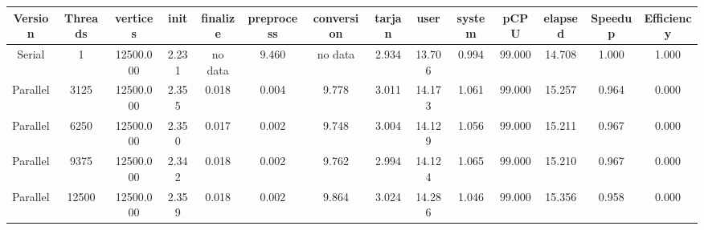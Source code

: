 \begin{tabular}{|c|c|c|c|c|c|c|c|c|c|c|c|c|c|}
\toprule
 Version &  Threads &  vertices &  init & finalize &  preprocess & conversion &  tarjan &   user &  system &   pCPU &  elapsed &  Speedup &  Efficiency \\
\midrule
  Serial &        1 & 12500.000 & 2.231 &  no data &       9.460 &    no data &   2.934 & 13.706 &   0.994 & 99.000 &   14.708 &    1.000 &       1.000 \\
Parallel &     3125 & 12500.000 & 2.355 &    0.018 &       0.004 &      9.778 &   3.011 & 14.173 &   1.061 & 99.000 &   15.257 &    0.964 &       0.000 \\
Parallel &     6250 & 12500.000 & 2.350 &    0.017 &       0.002 &      9.748 &   3.004 & 14.129 &   1.056 & 99.000 &   15.211 &    0.967 &       0.000 \\
Parallel &     9375 & 12500.000 & 2.342 &    0.018 &       0.002 &      9.762 &   2.994 & 14.124 &   1.065 & 99.000 &   15.210 &    0.967 &       0.000 \\
Parallel &    12500 & 12500.000 & 2.359 &    0.018 &       0.002 &      9.864 &   3.024 & 14.286 &   1.046 & 99.000 &   15.356 &    0.958 &       0.000 \\
\bottomrule
\end{tabular}
